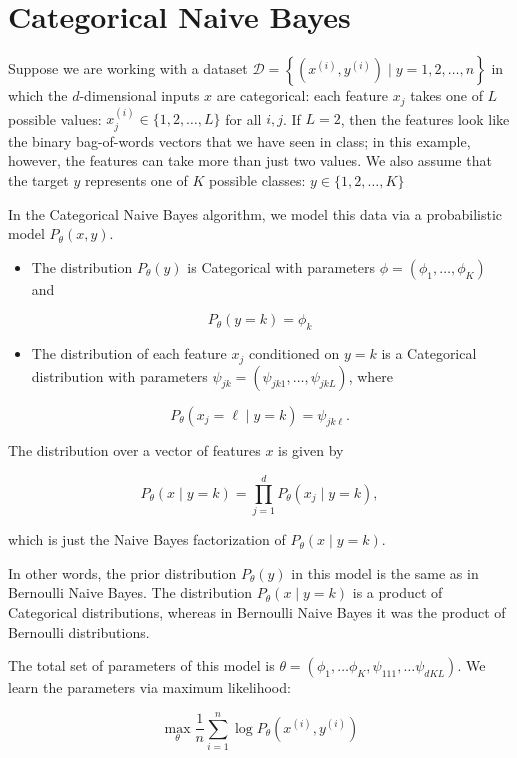 \documentclass[10pt, a4paper]{article}
\begin{document}
\section{Categorical Naive Bayes}

\begin{Problem*}
Suppose we are working with a dataset $\mathscr{D}=\left\{\left(x^{(i)}, y^{(i)}\right) \mid y=1,2, \ldots, n\right\}$ in which the $d$-dimensional inputs $x$ are categorical: each feature $x_{j}$ takes one of $L$ possible values: $x_{j}^{(i)} \in\{1,2, \ldots, L\}$ for all $i, j$. If $L=2$, then the features look like the binary bag-of-words vectors that we have seen in class; in this example, however, the features can take more than just two values. We also assume that the target $y$ represents one of $K$ possible classes: $y \in\{1,2, \ldots, K\}$

In the Categorical Naive Bayes algorithm, we model this data via a probabilistic model $P_{\theta}(x, y)$.

\begin{itemize}
  \item The distribution $P_{\theta}(y)$ is Categorical with parameters $\phi=\left(\phi_{1}, \ldots, \phi_{K}\right)$ and
\end{itemize}

$$
P_{\theta}(y=k)=\phi_{k}
$$

\begin{itemize}
  \item The distribution of each feature $x_{j}$ conditioned on $y=k$ is a Categorical distribution with parameters $\psi_{j k}=\left(\psi_{j k 1}, \ldots, \psi_{j k L}\right)$, where
\end{itemize}

$$
P_{\theta}\left(x_{j}=\ell \mid y=k\right)=\psi_{j k \ell} .
$$

The distribution over a vector of features $x$ is given by

$$
P_{\theta}(x \mid y=k)=\prod_{j=1}^{d} P_{\theta}\left(x_{j} \mid y=k\right),
$$

which is just the Naive Bayes factorization of $P_{\theta}(x \mid y=k)$.

In other words, the prior distribution $P_{\theta}(y)$ in this model is the same as in Bernoulli Naive Bayes. The distribution $P_{\theta}(x \mid y=k)$ is a product of Categorical distributions, whereas in Bernoulli Naive Bayes it was the product of Bernoulli distributions.

The total set of parameters of this model is $\theta=\left(\phi_{1}, \ldots \phi_{K}, \psi_{111}, \ldots \psi_{d K L}\right)$. We learn the parameters via maximum likelihood:

$$
\max _{\theta} \frac{1}{n} \sum_{i=1}^{n} \log P_{\theta}\left(x^{(i)}, y^{(i)}\right)
$$
\end{Problem*} 
\end{document}
